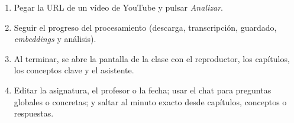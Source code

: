 \begin{enumerate}
  \item Pegar la URL de un vídeo de YouTube y pulsar \textit{Analizar}.
  \item Seguir el progreso del procesamiento (descarga, transcripción, guardado,
        \textit{embeddings} y análisis).
  \item Al terminar, se abre la pantalla de la clase con el reproductor, los capítulos, los
        conceptos clave y el asistente.
  \item Editar la asignatura, el profesor o la fecha; usar el chat para preguntas globales o
        concretas; y saltar al minuto exacto desde capítulos, conceptos o respuestas.
\end{enumerate}

